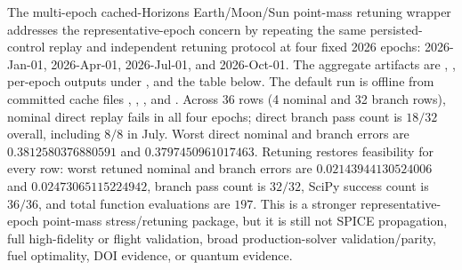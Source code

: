 \documentclass[11pt]{article}
\begin{document}
The multi-epoch cached-Horizons Earth/Moon/Sun point-mass retuning wrapper addresses the representative-epoch concern by repeating the same persisted-control replay and independent retuning protocol at four fixed 2026 epochs: 2026-Jan-01, 2026-Apr-01, 2026-Jul-01, and 2026-Oct-01. The aggregate artifacts are , , per-epoch outputs under , and the table below. The default run is offline from committed cache files , , , and . Across 36 rows (4 nominal and 32 branch rows), nominal direct replay fails in all four epochs; direct branch pass count is $18/32$ overall, including $8/8$ in July. Worst direct nominal and branch errors are $0.3812580376880591$ and $0.3797450961017463$. Retuning restores feasibility for every row: worst retuned nominal and branch errors are $0.02143944130524006$ and $0.02473065115224942$, branch pass count is $32/32$, SciPy success count is $36/36$, and total function evaluations are $197$. This is a stronger representative-epoch point-mass stress/retuning package, but it is still not SPICE propagation, full high-fidelity or flight validation, broad production-solver validation/parity, fuel optimality, DOI evidence, or quantum evidence.

\begin{table}[htbp]
\centering
\caption{Independent-HS multi-epoch cached-Horizons Earth/Moon/Sun point-mass retuning. Each epoch first replays persisted controls under the point-mass model and then independently retunes nominal and branch controls. Nominal direct replay fails in every epoch; all retuned rows pass the configured thresholds.}
\label{tab:supp_independent_hs_horizons_multi_epoch_point_mass_retuning}
\resizebox{\textwidth}{!}{}
\end{table}
\end{document}
